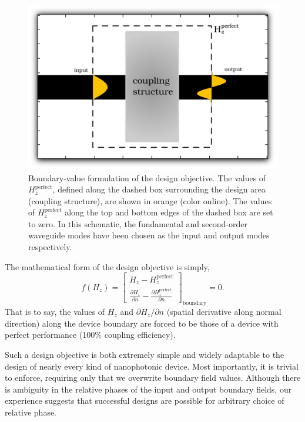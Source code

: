 \documentclass[letterpaper,10pt]{article}
\begin{document}
\begin{figure}[htbp]
    \centering
    \includegraphics[width=\textwidth]{intro} 
    \caption{Boundary-value formulation of the design objective.
        The values of $H_z^\text{perfect}$, 
            defined along the dashed box surrounding the design area
            (coupling structure), 
            are shown in orange (color online).
        The values of $H_z^\text{perfect}$ along the top and bottom edges
            of the dashed box are set to zero.
        In this schematic, the fundamental and second-order waveguide modes
            have been chosen as the input and output modes respectively.}
    \label{fig:intro}
\end{figure}

The mathematical form of the design objective is simply, 
    \begin{equation}
    f(H_z) = \begin{bmatrix}
        H_z - H_z^\text{perfect} \\
        \frac{\partial H_z}{\partial n} - 
            \frac{\partial H_z^\text{perfect}}{\partial n}
        \end{bmatrix}_\text{boundary}
        = 0.
    \end{equation}
That is to say,
    the values of $H_z$ and $\partial H_z / \partial n$
    (spatial derivative along normal direction)
    along the device boundary are forced to be 
    those of a device with perfect performance 
    (100\% coupling efficiency).
     
Such a design objective is both extremely simple and widely adaptable 
    to the design of nearly every kind of nanophotonic device.
Most importantly, it is trivial to enforce,
    requiring only that we overwrite boundary field values.
Although there is ambiguity in the relative phases of 
    the input and output boundary fields,
    our experience suggests that successful designs are possible for 
    arbitrary choice of relative phase.
\end{document}
